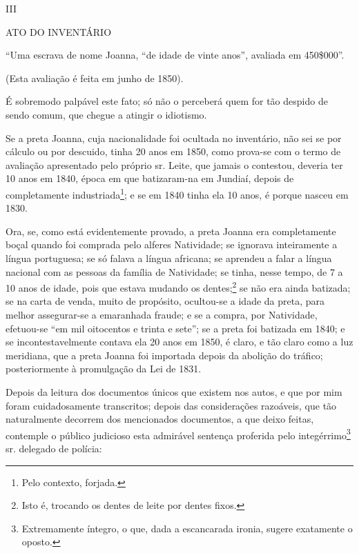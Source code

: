 {III

ATO DO INVENTÁRIO

``Uma escrava de nome Joanna, ``de idade de vinte anos'', avaliada em
450\$000''.

(Esta avaliação é feita em junho de 1850).

É sobremodo palpável este fato; só não o perceberá quem for tão despido
de sendo comum, que chegue a atingir o idiotismo.

Se a preta Joanna, cuja nacionalidade foi ocultada no inventário, não
sei se por cálculo ou por descuido, tinha 20 anos em 1850, como prova-se
com o termo de avaliação apresentado pelo próprio sr. Leite, que jamais
o contestou, deveria ter 10 anos em 1840, época em que batizaram-na em
Jundiaí, depois de completamente industriada\footnote{ Pelo contexto,
  forjada.}; e se em 1840 tinha ela 10 anos, é porque nasceu em 1830.

Ora, se, como está evidentemente provado, a preta Joanna era
completamente boçal quando foi comprada pelo alferes Natividade; se
ignorava inteiramente a língua portuguesa; se só falava a língua
africana; se aprendeu a falar a língua nacional com as pessoas da
família de Natividade; se tinha, nesse tempo, de 7 a 10 anos de idade,
pois que estava mudando os dentes;\footnote{ Isto é, trocando os dentes
  de leite por dentes fixos.} se não era ainda batizada; se na carta de
venda, muito de propósito, ocultou-se a idade da preta, para melhor
assegurar-se a emaranhada fraude; e se a compra, por Natividade,
efetuou-se ``em mil oitocentos e trinta e sete''; se a preta foi batizada
em 1840; e se incontestavelmente contava ela 20 anos em 1850, é claro, e
tão claro como a luz meridiana, que a preta Joanna foi importada depois
da abolição do tráfico; posteriormente à promulgação da Lei de 1831.

Depois da leitura dos documentos únicos que existem nos autos, e que por
mim foram cuidadosamente transcritos; depois das considerações
razoáveis, que tão naturalmente decorrem dos mencionados documentos, a
que deixo feitas, contemple o público judicioso esta admirável sentença
proferida pelo integérrimo\footnote{ Extremamente íntegro, o que, dada
  a escancarada ironia, sugere exatamente o oposto.} sr. delegado de
polícia:

}
